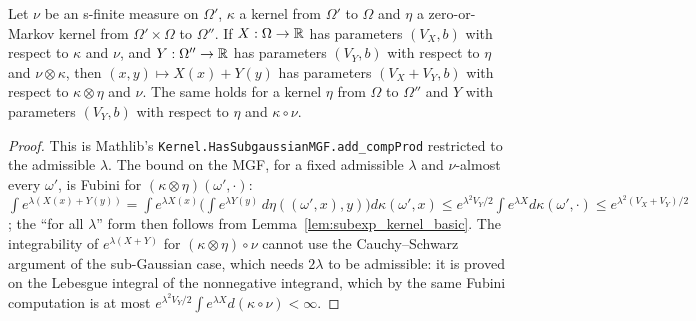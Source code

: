 \begin{lemma}\label{lem:subexp_add_compProd}
\leanok
{}
Let $\nu$ be an s-finite measure on $\Omega'$, $\kappa$ a kernel from $\Omega'$ to $\Omega$
and $\eta$ a zero-or-Markov kernel from $\Omega'\times\Omega$ to $\Omega''$. If
$X : \Omega\to\mathbb{R}$ has parameters $(V_X, b)$ with respect to $\kappa$ and $\nu$, and
$Y : \Omega''\to\mathbb{R}$ has parameters $(V_Y, b)$ with respect to $\eta$ and $\nu\otimes\kappa$,
then $(x, y) \mapsto X(x) + Y(y)$ has parameters $(V_X + V_Y, b)$ with respect to
$\kappa\otimes\eta$ and $\nu$. The same holds for a kernel $\eta$ from $\Omega$ to $\Omega''$
and $Y$ with parameters $(V_Y, b)$ with respect to $\eta$ and $\kappa\circ\nu$.
\end{lemma}

\begin{proof}
\leanok
{}
This is Mathlib's \texttt{Kernel.HasSubgaussianMGF.add\_compProd} restricted to the
admissible $\lambda$. The bound on the MGF, for a fixed admissible $\lambda$ and
$\nu$-almost every $\omega'$, is Fubini for $(\kappa\otimes\eta)(\omega',\cdot)$:
$\int e^{\lambda(X(x)+Y(y))} = \int e^{\lambda X(x)}\big(\int e^{\lambda Y(y)}\,d\eta((\omega',x),y)\big)d\kappa(\omega',x)
\le e^{\lambda^2V_Y/2}\int e^{\lambda X}d\kappa(\omega',\cdot) \le e^{\lambda^2(V_X+V_Y)/2}$;
the ``for all $\lambda$'' form then follows from Lemma~\ref{lem:subexp_kernel_basic}. The
integrability of $e^{\lambda(X+Y)}$ for $(\kappa\otimes\eta)\circ\nu$ cannot use the
Cauchy--Schwarz argument of the sub-Gaussian case, which needs $2\lambda$ to be admissible: it
is proved on the Lebesgue integral of the nonnegative integrand, which by the same Fubini
computation is at most $e^{\lambda^2V_Y/2}\int e^{\lambda X}d(\kappa\circ\nu) < \infty$.
\end{proof}

